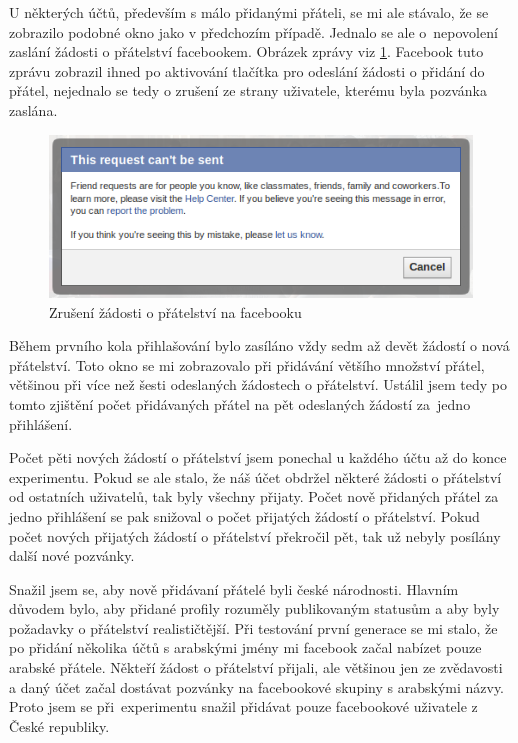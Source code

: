 \documentclass[thesis=M,czech]{FITthesis}[2013/05/10]
\begin{document}
U některých účtů, především s málo přidanými přáteli, se mi ale stávalo, že se zobrazilo podobné okno jako v předchozím případě. Jednalo se ale o~nepovolení zaslání žádosti o přátelství facebookem. Obrázek zprávy viz \ref{fig:cantFriend}. Facebook tuto zprávu zobrazil ihned po aktivování tlačítka pro odeslání žádosti o přidání do přátel, nejednalo se tedy o zrušení ze strany uživatele, kterému byla pozvánka zaslána.

\begin{figure}[h]
\begin{center}
\includegraphics[width=5in]{figures/cantFriend.png}
\caption{Zrušení žádosti o přátelství na facebooku}
\label{fig:cantFriend}
\end{center}
\end{figure}

Během prvního kola přihlašování bylo zasíláno vždy sedm až devět žádostí o nová přátelství. Toto okno se mi zobrazovalo při přidávání většího množství přátel, většinou při více než šesti odeslaných žádostech o přátelství. Ustálil jsem tedy po tomto zjištění počet přidávaných přátel na pět odeslaných žádostí za~jedno přihlášení.

Počet pěti nových žádostí o přátelství jsem ponechal u každého účtu až do konce experimentu. Pokud se ale stalo, že náš účet obdržel některé žádosti o přátelství od ostatních uživatelů, tak byly všechny přijaty. Počet nově přidaných přátel za jedno přihlášení se pak snižoval o počet přijatých žádostí o přátelství. Pokud počet nových přijatých žádostí o přátelství překročil pět, tak už nebyly posílány další nové pozvánky.

Snažil jsem se, aby nově přidávaní přátelé byli české národnosti. Hlavním důvodem bylo, aby přidané profily rozuměly publikovaným statusům a aby byly požadavky o přátelství realističtější. Při testování první generace se mi stalo, že po přidání několika účtů s arabskými jmény mi facebook začal nabízet pouze arabské přátele. Někteří žádost o přátelství přijali, ale většinou jen ze zvědavosti a daný účet začal dostávat pozvánky na facebookové skupiny s arabskými názvy. Proto jsem se při~experimentu snažil přidávat pouze facebookové uživatele z České republiky.
\end{document}
